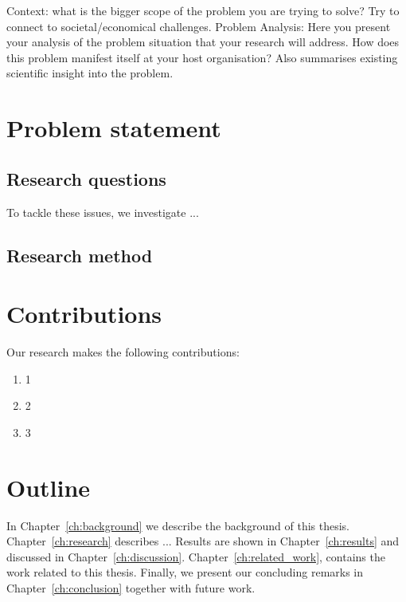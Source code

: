 \documentclass[../main]{subfiles}
\begin{document}
\label{ch:introduction}
Context: what is the bigger scope of the problem you are trying to solve? Try to connect to societal/economical challenges.
Problem Analysis: Here you present your analysis of the problem situation that your research will address.
How does this problem manifest itself at your host organisation?
Also summarises existing scientific insight into the problem.
\glo

\section{Problem statement}


\subsection{Research questions}
To tackle these issues, we investigate ...

\subsection{Research method}


\section{Contributions}
Our research makes the following contributions:
\begin{enumerate}
	\item 1
	\item 2
	\item 3
\end{enumerate}

\section{Outline}
In Chapter~\ref{ch:background} we describe the background of this thesis. 
Chapter~\ref{ch:research} describes ... 
Results are shown in Chapter~\ref{ch:results} and discussed in Chapter~\ref{ch:discussion}. Chapter~\ref{ch:related_work}, contains the work related to this thesis.
Finally, we present our concluding remarks in Chapter~\ref{ch:conclusion} together with future work.
\end{document}
